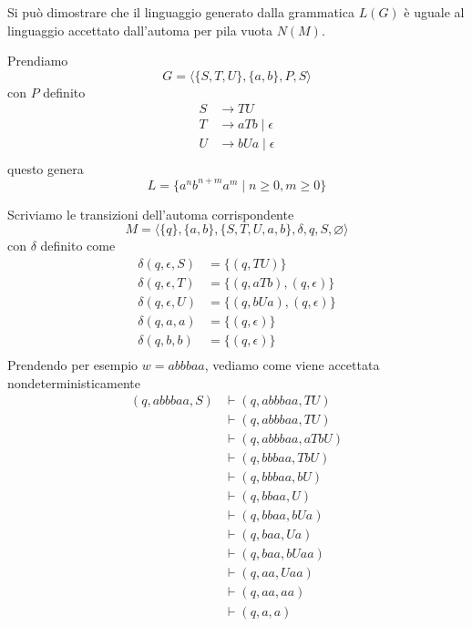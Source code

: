 \documentclass[12pt]{article}
\begin{document}
Si può dimostrare che il linguaggio generato dalla grammatica $L(G)$ è uguale al linguaggio accettato dall'automa per pila vuota $N(M)$.

\begin{tcolorbox}[breakable]
	Prendiamo
	$$ G = \langle \{S, T, U\}, \{a, b\}, P, S \rangle $$
	con $P$ definito
	\begin{align*}
		S &\rightarrow TU  \\
		T &\rightarrow a T b \mid \epsilon \\
		U &\rightarrow b U a \mid \epsilon \\
	\end{align*}
	questo genera
	$$ L = \{ a^n b^{n + m} a^m \mid n \geq 0, m \geq 0 \} $$

	Scriviamo le transizioni dell'automa corrispondente
	$$ M = \langle \{q\}, \{a, b\}, \{S, T, U, a, b\}, \delta, q, S, \varnothing \rangle $$
	con $\delta$ definito come
	\begin{align*}
		\delta(q, \epsilon, S) &= \{(q, TU)\} \\
		\delta(q, \epsilon, T) &= \{(q, a T b), (q, \epsilon) \} \\
		\delta(q, \epsilon, U) &= \{(q, b U a), (q, \epsilon) \} \\
		\delta(q, a, a) &= \{(q, \epsilon)\} \\
		\delta(q, b, b) &= \{(q, \epsilon)\} \\
	\end{align*}
	\newpage
	Prendendo per esempio $w = abbbaa$, vediamo come viene accettata nondeterministicamente
	\begin{align*}
		(q, abbbaa, S) &\vdash (q, abbbaa, TU) \\
		               &\vdash (q, abbbaa, TU) \\
		               &\vdash (q, abbbaa, aTbU) \\
		               &\vdash (q, bbbaa, TbU) \\
		               &\vdash (q, bbbaa, bU) \\
		               &\vdash (q, bbaa, U) \\
		               &\vdash (q, bbaa, bUa) \\
		               &\vdash (q, baa, Ua) \\
		               &\vdash (q, baa, bUaa) \\
		               &\vdash (q, aa, Uaa) \\
		               &\vdash (q, aa, aa) \\
		               &\vdash (q, a, a) \\

\end{align*}
\end{tcolorbox}
\end{document}
